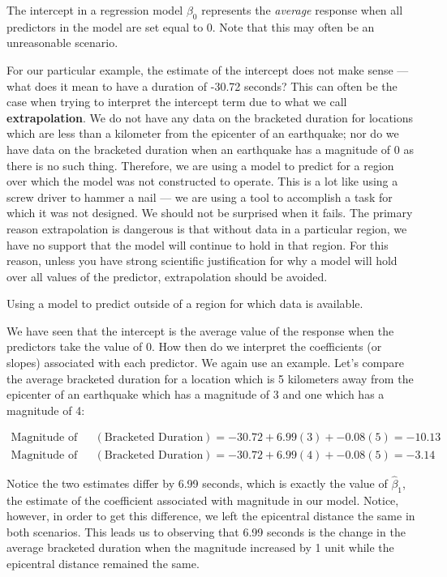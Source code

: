 \documentclass[]{book}
\theoremstyle{definition}
\theoremstyle{definition}
\theoremstyle{definition}
\theoremstyle{remark}
\let\BeginKnitrBlock\begin \let\EndKnitrBlock\end
\begin{document}
\BeginKnitrBlock{rmdtip}
The intercept in a regression model \(\beta_0\) represents the
\emph{average} response when all predictors in the model are set equal
to 0. Note that this may often be an unreasonable scenario.
\EndKnitrBlock{rmdtip}

For our particular example, the estimate of the intercept does not make
sense --- what does it mean to have a duration of -30.72 seconds? This
can often be the case when trying to interpret the intercept term due to
what we call \textbf{extrapolation}. We do not have any data on the
bracketed duration for locations which are less than a kilometer from
the epicenter of an earthquake; nor do we have data on the bracketed
duration when an earthquake has a magnitude of 0 as there is no such
thing. Therefore, we are using a model to predict for a region over
which the model was not constructed to operate. This is a lot like using
a screw driver to hammer a nail --- we are using a tool to accomplish a
task for which it was not designed. We should not be surprised when it
fails. The primary reason extrapolation is dangerous is that without
data in a particular region, we have no support that the model will
continue to hold in that region. For this reason, unless you have strong
scientific justification for why a model will hold over all values of
the predictor, extrapolation should be avoided.

\BeginKnitrBlock{definition}[Extrapolation]
\protect\hypertarget{def:defn-extrapolation}{}{\label{def:defn-extrapolation}
{} }Using a model to predict outside of a
region for which data is available.
\EndKnitrBlock{definition}

We have seen that the intercept is the average value of the response
when the predictors take the value of 0. How then do we interpret the
coefficients (or slopes) associated with each predictor. We again use an
example. Let's compare the average bracketed duration for a location
which is 5 kilometers away from the epicenter of an earthquake which has
a magnitude of 3 and one which has a magnitude of 4:

\[
\begin{aligned}
  \text{Magnitude of 3:} \quad &(\text{Bracketed Duration}) = -30.72 + 6.99 (3) + -0.08(5) = -10.13 \\
  \text{Magnitude of 4:} \quad &(\text{Bracketed Duration}) = -30.72 + 6.99 (4) + -0.08(5) = -3.14
\end{aligned}
\]

Notice the two estimates differ by 6.99 seconds, which is exactly the
value of \(\widehat{\beta}_1\), the estimate of the coefficient
associated with magnitude in our model. Notice, however, in order to get
this difference, we left the epicentral distance the same in both
scenarios. This leads us to observing that 6.99 seconds is the change in
the average bracketed duration when the magnitude increased by 1 unit
while the epicentral distance remained the same.
\end{document}
